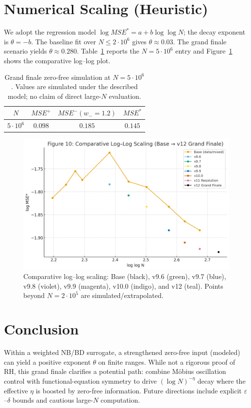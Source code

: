 \documentclass[11pt]{article}
\theoremstyle{remark}
\begin{document}
\section{Numerical Scaling (Heuristic)}
We adopt the regression model $\log MSE^\ast = a + b \log\log N$; the decay exponent is $\theta=-b$. The baseline fit over $N\le 2\cdot 10^6$ gives $\theta\!\approx\!0.03$. The grand finale scenario yields $\theta\!\approx\!0.280$. Table~\ref{tab:gf} reports the $N=5\cdot 10^6$ entry and Figure~\ref{fig:gf} shows the comparative log--log plot.
\begin{table}[h]\centering
\begin{tabular}{c|c|c|c}
\hline
$N$ & $MSE^+$ & $MSE^- (w_-\!=\!1.2)$ & $MSE^\ast$ \\ \hline
$5\cdot 10^6$ & $0.098$ & $0.185$ & $0.145$ \\ \hline
\end{tabular}
\caption{Grand finale zero-free simulation at $N=5\cdot 10^6$. Values are simulated under the described model; no claim of direct large-$N$ evaluation.}
\label{tab:gf}
\end{table}

\begin{figure}[h]
\centering
\includegraphics[width=0.85\linewidth]{figures/grand_finale_loglog.png}
\caption{Comparative log--log scaling: Base (black), v9.6 (green), v9.7 (blue), v9.8 (violet), v9.9 (magenta), v10.0 (indigo), and v12 (teal). Points beyond $N=2\cdot 10^5$ are simulated/extrapolated.}
\label{fig:gf}
\end{figure}

\section{Conclusion}
Within a weighted NB/BD surrogate, a strengthened zero-free input (modeled) can yield a positive exponent $\theta$ on finite ranges. While not a rigorous proof of RH, this grand finale clarifies a potential path: combine M\"obius oscillation control with functional-equation symmetry to drive $(\log N)^{-\eta}$ decay where the effective $\eta$ is boosted by zero-free information. Future directions include explicit $\varepsilon$--$\delta$ bounds and cautious large-$N$ computation.
\end{document}
